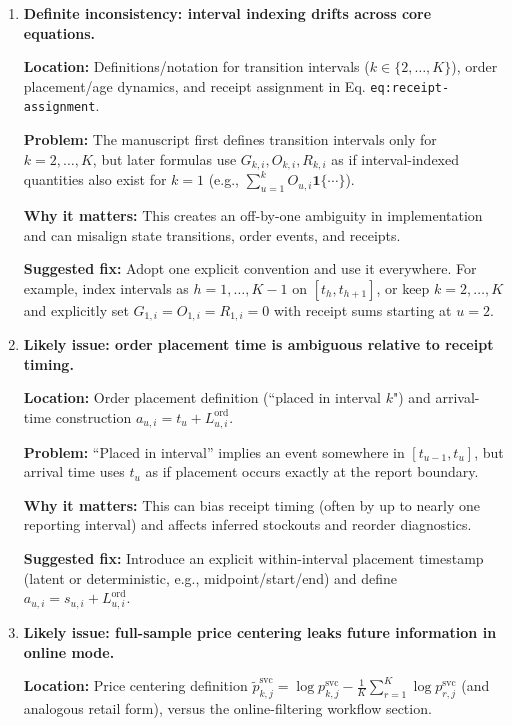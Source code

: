 \documentclass[11pt]{article}
\begin{document}
\begin{enumerate}
  \item \textbf{Definite inconsistency: interval indexing drifts across core equations.}

  \textbf{Location:} Definitions/notation for transition intervals ($k\in\{2,\dots,K\}$), order placement/age dynamics, and receipt assignment in Eq. \texttt{eq:receipt-assignment}.

  \textbf{Problem:} The manuscript first defines transition intervals only for $k=2,\dots,K$, but later formulas use $G_{k,i}, O_{k,i}, R_{k,i}$ as if interval-indexed quantities also exist for $k=1$ (e.g., $\sum_{u=1}^{k} O_{u,i}\mathbf{1}\{\cdots\}$).

  \textbf{Why it matters:} This creates an off-by-one ambiguity in implementation and can misalign state transitions, order events, and receipts.

  \textbf{Suggested fix:} Adopt one explicit convention and use it everywhere. For example, index intervals as $h=1,\dots,K-1$ on $[t_h,t_{h+1}]$, or keep $k=2,\dots,K$ and explicitly set $G_{1,i}=O_{1,i}=R_{1,i}=0$ with receipt sums starting at $u=2$.

  \item \textbf{Likely issue: order placement time is ambiguous relative to receipt timing.}

  \textbf{Location:} Order placement definition (``placed in interval $k$") and arrival-time construction $a_{u,i}=t_u+L^{\mathrm{ord}}_{u,i}$.

  \textbf{Problem:} ``Placed in interval'' implies an event somewhere in $[t_{u-1},t_u]$, but arrival time uses $t_u$ as if placement occurs exactly at the report boundary.

  \textbf{Why it matters:} This can bias receipt timing (often by up to nearly one reporting interval) and affects inferred stockouts and reorder diagnostics.

  \textbf{Suggested fix:} Introduce an explicit within-interval placement timestamp (latent or deterministic, e.g., midpoint/start/end) and define $a_{u,i}=s_{u,i}+L^{\mathrm{ord}}_{u,i}$.

  \item \textbf{Likely issue: full-sample price centering leaks future information in online mode.}

  \textbf{Location:} Price centering definition
  $\tilde p^{\mathrm{svc}}_{k,j}=\log p^{\mathrm{svc}}_{k,j}-\frac{1}{K}\sum_{r=1}^K\log p^{\mathrm{svc}}_{r,j}$
  (and analogous retail form), versus the online-filtering workflow section.


\end{enumerate}
\end{document}
